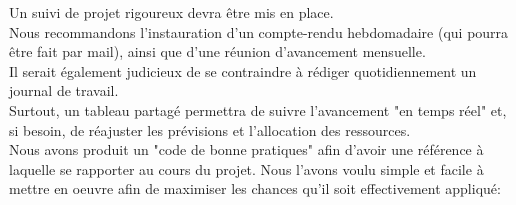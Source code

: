 Un suivi de projet rigoureux devra être mis en place.\\

Nous recommandons l'instauration d'un compte-rendu hebdomadaire (qui pourra être fait par mail), ainsi que d'une réunion d'avancement mensuelle.\\

Il serait également judicieux de se contraindre à rédiger quotidiennement un journal de travail.\\

Surtout, un tableau partagé permettra de suivre l'avancement "en temps réel" et, si besoin, de réajuster les prévisions et l'allocation des ressources.\\

Nous avons produit un "code de bonne pratiques" afin d'avoir une référence à laquelle se rapporter au cours du projet. Nous l'avons voulu simple et facile à mettre en oeuvre afin de maximiser les chances qu'il soit effectivement appliqué:\\
